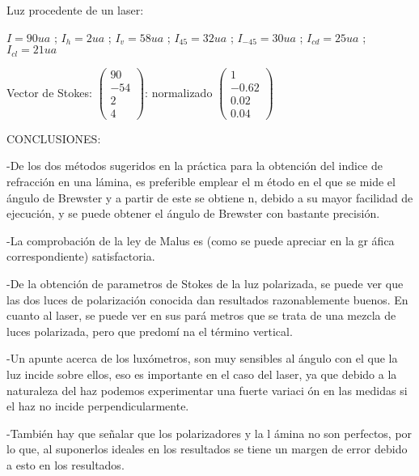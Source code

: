 \documentclass[12pt,thmsa]{article}
\begin{document}
Luz procedente de un laser:

$I=90ua$ ; $I_{h}=2ua$ ; $I_{v}=58ua$ ; $I_{45}=32ua$ ; $I_{-45}=30ua$ ; $%
I_{cd}=25ua$ ; $I_{cl}=21ua$

Vector de Stokes: $\left( 
\begin{array}{l}
90 \\ 
-54 \\ 
2 \\ 
4
\end{array}
\right) $: normalizado $\left( 
\begin{array}{l}
1 \\ 
-0.62 \\ 
0.02 \\ 
0.04
\end{array}
\right) $

CONCLUSIONES:

\vspace{1pt}

-De los dos m\'{e}todos sugeridos en la pr\'{a}ctica para la obtenci\'{o}n
del indice de refracci\'{o}n en una l\'{a}mina, es preferible emplear el m%
\'{e}todo en el que se mide el \'{a}ngulo de Brewster y a partir de este se
obtiene n, debido a su mayor facilidad de ejecuci\'{o}n, y se puede obtener
el \'{a}ngulo de Brewster con bastante precisi\'{o}n.

-La comprobaci\'{o}n de la ley de Malus es (como se puede apreciar en la gr%
\'{a}fica correspondiente) satisfactoria.

-De la obtenci\'{o}n de parametros de Stokes de la luz polarizada, se puede
ver que las dos luces de polarizaci\'{o}n conocida dan resultados
razonablemente buenos. En cuanto al laser, se puede ver en sus par\'{a}%
metros que se trata de una mezcla de luces polarizada, pero que predom\'{i}%
na el t\'{e}rmino vertical.

-Un apunte acerca de los lux\'{o}metros, son muy sensibles al \'{a}ngulo con
el que la luz incide sobre ellos, eso es importante en el caso del laser, ya
que debido a la naturaleza del haz podemos experimentar una fuerte variaci%
\'{o}n en las medidas si el haz no incide perpendicularmente.

\vspace{1pt}-Tambi\'{e}n hay que se\~{n}alar que los polarizadores y la l%
\'{a}mina no son perfectos, por lo que, al suponerlos ideales en los
resultados se tiene un margen de error debido a esto en los resultados.

\vspace{1pt}


\ 
\end{document}
